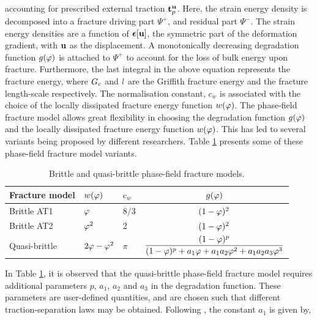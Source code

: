 \documentclass[11pt]{article}
\begin{document}
\noindent accounting for prescribed external traction $\hbox{$\mathbf{t}_{p}^{\scriptsize{\hbox{$\mathbf{u}$}}}$}$. Here, the strain energy density is decomposed into a fracture driving part $\Psi^+$, and residual part $\Psi^-$. The strain energy densities are a function of $\hbox{$\hbox{\boldmath$\epsilon$}$}[\hbox{$\mathbf{u}$}]$, the symmetric part of the deformation gradient, with $\hbox{$\mathbf{u}$}$ as the displacement. A monotonically decreasing degradation function $g(\hbox{$\varphi$})$ is attached to $\Psi^+$ to account for the loss of bulk energy upon fracture.   Furthermore, the last integral in the above equation represents the fracture energy, where $\hbox{$G_c$}$ and $\hbox{$l$}$ are the Griffith fracture energy and the fracture length-scale respectively. The normalisation constant, $c_w$ is associated with the choice of the locally dissipated fracture energy function $w(\hbox{$\varphi$})$. The phase-field fracture model allows great flexibility in choosing the degradation function $g(\hbox{$\varphi$})$ and the locally dissipated fracture energy function $w(\hbox{$\varphi$})$. This has led to several variants being proposed by different researchers. Table \ref{sec2:table:brittleQuasiModelsParams} presents some of these phase-field fracture model variants.

\begingroup
\renewcommand{\arraystretch}{1.3}
\begin{table}[ht!]
    \centering
    \setlength\fboxsep{0pt}
    \begin{tabular}{lllc} \hline
    Fracture model  & $w(\hbox{$\varphi$})$ & $c_w$ & $g(\hbox{$\varphi$})$  \\ \hline
    Brittle AT1 \cite{pham2011} & $\hbox{$\varphi$}$  & 8/3 & $(1-\hbox{$\varphi$})^2$ \\ 
    Brittle AT2 \cite{Bourdin2000}  & $\hbox{$\varphi$}^2$ & 2 &  $(1-\hbox{$\varphi$})^2$ \\ 
    Quasi-brittle \cite{wu2017}  & $2\hbox{$\varphi$}-\hbox{$\varphi$}^2$ & $\pi$ & $\dfrac{(1-\hbox{$\varphi$})^p}{(1-\hbox{$\varphi$})^p + a_1\hbox{$\varphi$} + a_1 a_2 \hbox{$\varphi$}^2 + a_1 a_2 a_3 \hbox{$\varphi$}^3}$ \\ \hline
    \end{tabular}
    \caption{Brittle and quasi-brittle phase-field fracture models.}
    \label{sec2:table:brittleQuasiModelsParams}
\end{table}
\endgroup

In Table \ref{sec2:table:brittleQuasiModelsParams}, it is observed that the quasi-brittle phase-field fracture model requires additional parameters $p$, $a_1$, $a_2$ and $a_3$ in the degradation function. These parameters are user-defined quantities, and are chosen such that different traction-separation laws may be obtained. Following \cite{wu2017}, the constant $a_1$ is given by,
\end{document}
